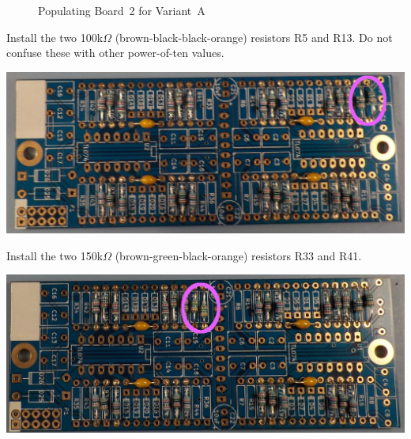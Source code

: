 \begin{figure}
\par
\caption{Populating Board~2 for Variant~A}\label{fig:board-stuffing-2a}
\end{figure}

Install the two 100k$\Omega$ (brown-black-black-orange) resistors R5
and R13.  Do not confuse these with other power-of-ten values.

\noindent\includegraphics[width=\linewidth]{res-100kA.jpg}

Install the two 150k$\Omega$ (brown-green-black-orange) resistors R33
and R41.

\noindent\includegraphics[width=\linewidth]{res-150kA.jpg}

